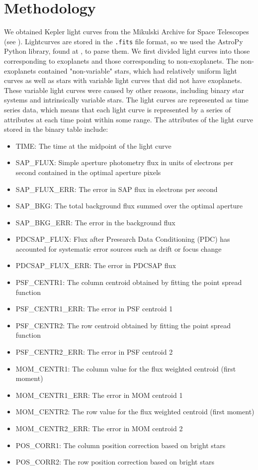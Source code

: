 \documentclass{amsart}
\begin{document}
\section{Methodology}
We obtained Kepler light curves from the Mikulski Archive for Space Telescopes (see \cite{mast}). Lightcurves are stored in the \texttt{.fits} file format, so we used the AstroPy Python library, found at \cite{AstroPy}, to parse them. We first divided light curves into those corresponding to exoplanets and those corresponding to non-exoplanets. The non-exoplanets contained "non-variable" stars, which had relatively uniform light curves as well as stars with variable light curves that did not have exoplanets. These variable light curves were caused by other reasons, including binary star systems and intrinsically variable stars. The light curves are represented as time series data, which means that each light curve is represented by a series of attributes at each time point within some range. The attributes of the light curve stored in the binary table include:
\begin{itemize}
	\item TIME: The time at the midpoint of the light curve
	\item SAP\_FLUX: Simple aperture photometry flux in units of electrons per second contained in the optimal aperture pixels
	\item SAP\_FLUX\_ERR: The error in SAP flux in electrons per second
	\item SAP\_BKG: The total background flux summed over the optimal aperture
	\item SAP\_BKG\_ERR: The error in the background flux
	\item PDCSAP\_FLUX: Flux after Presearch Data Conditioning (PDC) has accounted for systematic error sources such as drift or focus change
	\item PDCSAP\_FLUX\_ERR: The error in PDCSAP flux
	\item PSF\_CENTR1: The column centroid obtained by fitting the point spread function
	\item PSF\_CENTR1\_ERR: The error in PSF centroid 1
	\item PSF\_CENTR2: The row centroid obtained by fitting the point spread function
	\item PSF\_CENTR2\_ERR: The error in PSF centroid 2
	\item MOM\_CENTR1: The column value for the flux weighted centroid (first moment)
	\item MOM\_CENTR1\_ERR: The error in MOM centroid 1
	\item MOM\_CENTR2: The row value for the flux weighted centroid (first moment)
	\item MOM\_CENTR2\_ERR: The error in MOM centroid 2
	\item POS\_CORR1: The column position correction based on bright stars 
	\item POS\_CORR2: The row position correction based on bright stars
\end{itemize}
\end{document}
